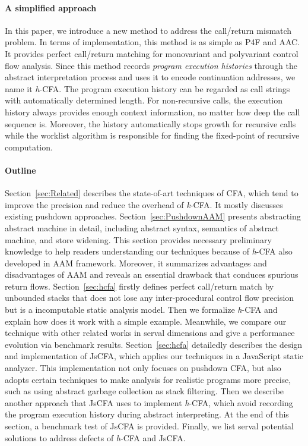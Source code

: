 \documentclass{article}
\begin{document}
\paragraph{A simplified approach}
In this paper, we introduce a new method to address the call/return mismatch problem.
In terms of implementation, this method is as simple as P4F and AAC\@.
It provides perfect call/return matching for monovariant and polyvariant control flow analysis.
Since this method records \emph{program execution histories} through the abstract interpretation process and uses it to encode continuation addresses, we name it \textit{h}-CFA\@.
The program execution history can be regarded as call strings with automatically determined length.
For non-recursive calls, the execution history always provides enough context information, no matter how deep the call sequence is.
Moreover, the history automatically stops growth for recursive calls while the worklist algorithm is responsible
for finding the fixed-point of recursive computation.

\paragraph{Outline}
Section~\ref{sec:Related} describes the state-of-art techniques of CFA, which tend to improve the precision and reduce the overhead of \textit{k}-CFA\@. It mostly discusses existing pushdown approaches.
Section~\ref{sec:PushdownAAM} presents abstracting abstract machine in detail, including abstract syntax, semantics of abstract machine,
and store widening.
This section provides necessary preliminary knowledge to help readers understanding our techniques because of \textit{h}-CFA also developed in AAM framework.
Moreover, it summarizes advantages and disadvantages of AAM and reveals an essential drawback that conduces spurious return flows.
Section~\ref{sec:hcfa} firstly defines perfect call/return match by unbounded stacks that does not lose any inter-procedural control flow precision but is a incomputable static analysis model.
Then we formalize \textit{h}-CFA and explain how does it work with a simple example.
Meanwhile, we compare our technique with other related works in serval dimensions and give a performance evolution via benchmark results.
Section~\ref{sec:hcfa} detailedly describes the design and implementation of JsCFA, which applies our techniques in a JavaScript static analyzer.
This implementation not only focuses on pushdown CFA, but also adopts certain techniques to make analysis for realistic programs more precise, such as using abstract garbage collection as stack filtering.
Then we describe another approach that JsCFA uses to implement \textit{h}-CFA, which avoid recording the program execution history during abstract interpreting.
At the end of this section, a benchmark test of JsCFA is provided.
Finally, we list serval potential solutions to address defects of \textit{h}-CFA and JsCFA\@.
\end{document}
